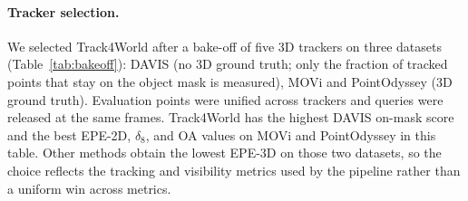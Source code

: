 \paragraph{Tracker selection.}
We selected Track4World after a bake-off of five 3D trackers on three datasets (Table~\ref{tab:bakeoff}): DAVIS (no 3D ground truth; only the fraction of tracked points that stay on the object mask is measured), MOVi and PointOdyssey (3D ground truth).
Evaluation points were unified across trackers and queries were released at the same frames.
Track4World has the highest DAVIS on-mask score and the best EPE-2D, $\delta_8$, and OA values on MOVi and PointOdyssey in this table. Other methods obtain the lowest EPE-3D on those two datasets, so the choice reflects the tracking and visibility metrics used by the pipeline rather than a uniform win across metrics.

